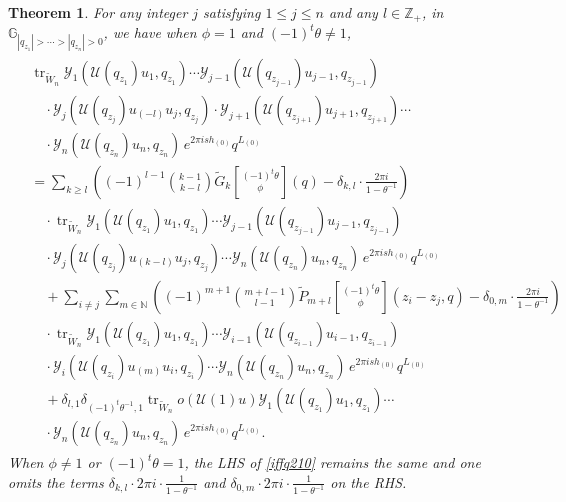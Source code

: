 \documentclass[9pt]{amsart}
\newtheorem{theorem}{Theorem}[section]
\newcommand{\Y}{\mathcal{Y}}
\begin{document}
\begin{theorem}\label{iffq29}
For any integer $j$ satisfying $1 \leq j \leq n$ and any $l \in \mathbb{Z}_{+}$, in $\mathbb{G}_{|q_{z_{1}}|>\cdots>|q_{z_{n}}|>0}$, we have when $\phi = 1$ and $(-1)^{t}\theta \neq 1$,
\begin{align}\label{iffq210}
\begin{split}
  &\operatorname{tr}_{\tilde{W}_n} \Y_1(\mathcal{U}(q_{z_1})u_1, q_{z_1}) \cdots \Y_{j-1}(\mathcal{U}(q_{z_{j-1}})u_{j-1}, q_{z_{j-1}}) \\
  &\quad \cdot \Y_j(\mathcal{U}(q_{z_j})u_{(-l)}u_j, q_{z_j}) \cdot \Y_{j+1}(\mathcal{U}(q_{z_{j+1}})u_{j+1}, q_{z_{j+1}}) \cdots \\
  &\quad \cdot \Y_n(\mathcal{U}(q_{z_n})u_n, q_{z_n})\, e^{2\pi i s h_{(0)}} q^{L_{(0)}} \\
  &= \sum_{k \geq l} \left( (-1)^{l-1} \binom{k-1}{k-l} \tilde{G}_k 
     \genfrac[]{0pt}{0}{(-1)^t\theta}{\phi}(q) 
     - \delta_{k,l} \cdot \frac{2\pi i}{1 - \theta^{-1}} \right) \\
  &\quad \cdot \operatorname{tr}_{\tilde{W}_n} \Y_1(\mathcal{U}(q_{z_1})u_1, q_{z_1}) \cdots 
     \Y_{j-1}(\mathcal{U}(q_{z_{j-1}})u_{j-1}, q_{z_{j-1}}) \\
  &\quad \cdot \Y_j(\mathcal{U}(q_{z_j})u_{(k-l)}u_j, q_{z_j}) \cdots 
     \Y_n(\mathcal{U}(q_{z_n})u_n, q_{z_n})\, e^{2\pi i s h_{(0)}} q^{L_{(0)}} \\
  &\quad + \sum_{i \neq j} \sum_{m \in \mathbb{N}} 
     \left( (-1)^{m+1} \binom{m+l-1}{l-1} 
     \tilde{P}_{m+l} \genfrac[]{0pt}{0}{(-1)^t\theta}{\phi}(z_i - z_j, q) 
     - \delta_{0,m} \cdot \frac{2\pi i}{1 - \theta^{-1}} \right) \\
  &\quad \cdot \operatorname{tr}_{\tilde{W}_n} 
     \Y_1(\mathcal{U}(q_{z_1})u_1, q_{z_1}) \cdots 
     \Y_{i-1}(\mathcal{U}(q_{z_{i-1}})u_{i-1}, q_{z_{i-1}}) \\
  &\quad \cdot \Y_i(\mathcal{U}(q_{z_i})u_{(m)}u_i, q_{z_i}) \cdots 
     \Y_n(\mathcal{U}(q_{z_n})u_n, q_{z_n})\, e^{2\pi i s h_{(0)}} q^{L_{(0)}} \\
  &\quad + \delta_{l,1} \delta_{(-1)^t\theta^{-1},1} 
     \operatorname{tr}_{\tilde{W}_n} o(\mathcal{U}(1)u) 
     \Y_1(\mathcal{U}(q_{z_1})u_1, q_{z_1}) \cdots \\
  &\quad \cdot \Y_n(\mathcal{U}(q_{z_n})u_n, q_{z_n})\, 
     e^{2\pi i s h_{(0)}} q^{L_{(0)}}.
\end{split}
\end{align}
When $\phi \neq 1$ or $(-1)^t \theta = 1$, the LHS of \eqref{iffq210} remains the same and one omits the terms $\delta_{k,l} \cdot 2\pi i \cdot \frac{1}{1 - \theta^{-1}}$ and $\delta_{0,m} \cdot 2\pi i \cdot \frac{1}{1 - \theta^{-1}}$ on the RHS.
\end{theorem}
\end{document}
